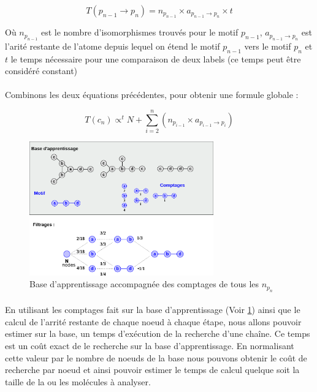 \documentclass[12pt,french,twoside]{report}
\begin{document}
\begin{equation}
 T(p_{n-1} \rightarrow p_n) = n_{p_{n-1}} \times a_{p_{n-1} \rightarrow p_n} \times t
\end{equation}

Où $n_{p_{n-1}}$ est le nombre d'isomorphismes trouvés pour le motif $p_{n-1}$, $a_{p_{n-1} \rightarrow p_n}$ est l'arité restante
de l'atome depuis lequel on étend le motif $p_{n-1}$ vers le motif $p_n$ et $t$ le temps nécessaire pour une comparaison de deux
labels (ce temps peut être considéré constant)

\paragraph{}Combinons les deux équations précédentes, pour obtenir une formule globale :

\begin{equation}
 T(c_n) \propto^t N + \sum_{i=2}^n (n_{p_{i-1}} \times a_{p_{i-1} \rightarrow p_i})
\end{equation}

\begin{figure}
  \includegraphics[width=300px]{Figures/s2m/indexation/apprentissage_comptage.png}
  \caption{\label{app_compt}Base d'apprentissage accompagnée des comptages de tous les $n_{p_{n}}$}
\end{figure}

\paragraph{}En utilisant les comptages fait sur la base d'apprentissage (Voir \ref{app_compt}) ainsi que le calcul de l'arrité
restante de chaque noeud à chaque étape, nous allons pouvoir estimer sur la base, un temps d'exécution de la recherche d'une
chaîne. Ce temps est un coût exact de le recherche sur la base d'apprentissage. En normalisant cette valeur par le nombre de
noeuds de la base nous pouvons obtenir le coût de recherche par noeud et ainsi pouvoir estimer le temps de calcul quelque soit
la taille de la ou les molécules à analyser.
\end{document}
